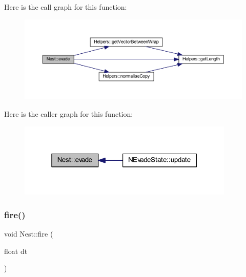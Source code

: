 Here is the call graph for this function\+:
\nopagebreak
\begin{figure}[H]
\begin{center}
\leavevmode
\includegraphics[width=350pt]{class_nest_ad5b9ccc37ae3a0d503c524f808a8fd1c_cgraph}
\end{center}
\end{figure}
Here is the caller graph for this function\+:
\nopagebreak
\begin{figure}[H]
\begin{center}
\leavevmode
\includegraphics[width=292pt]{class_nest_ad5b9ccc37ae3a0d503c524f808a8fd1c_icgraph}
\end{center}
\end{figure}
\mbox{\label{class_nest_ac8d249dfb5462f7942a1f898099ca0af}} 
\subsubsection{\texorpdfstring{fire()}{fire()}}
{\footnotesize\ttfamily void Nest\+::fire (\begin{DoxyParamCaption}\item[{float}]{dt }\end{DoxyParamCaption})}


